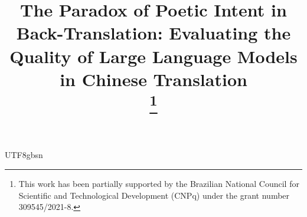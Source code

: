 \documentclass[conference]{IEEEtran}
\begin{document}
\begin{CJK}{UTF8}{gbsn}%

\title{The Paradox of Poetic Intent in Back-Translation: Evaluating the Quality of Large Language Models in Chinese Translation\\

\thanks{This work has been partially supported by the Brazilian National Council for Scientific and Technological Development (CNPq) under the grant number 309545/2021-8.}
}

\author{
\and



}

\maketitle


\end{CJK}
\end{document}
